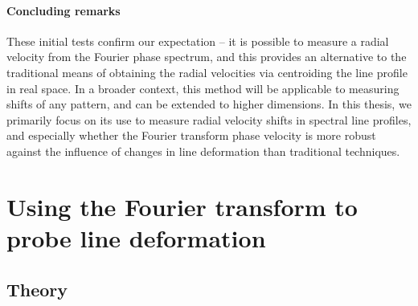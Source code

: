%
%



\paragraph{Concluding remarks}
These initial  tests confirm our expectation --  it is possible to measure a radial velocity from
the Fourier phase spectrum, and this provides an alternative to the traditional 
means of obtaining the radial velocities via centroiding the line profile in real space. 
In a broader context, this method will be applicable to measuring shifts of any pattern, and  
can be extended to higher dimensions. In this thesis, we primarily focus on its use to measure radial velocity shifts 
in spectral line profiles, and especially whether the Fourier transform phase velocity is more
robust against the influence of changes in line deformation than traditional techniques.


\section{Using the Fourier transform to probe line deformation}
\label{\thesection}
\label{sec:FT_ld}


\subsection{Theory}
\label{sec:LD_Theory}


